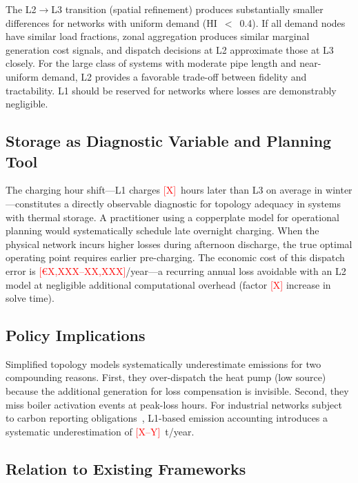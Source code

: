 \documentclass[review,3p]{elsarticle}
\newcommand{\placeholder}[1]{\textcolor{red}{[#1]}}
\begin{document}
The L2$\rightarrow$L3 transition (spatial refinement) produces
substantially smaller differences for networks with uniform demand
(HI~$<$~0.4). If all demand nodes have similar load fractions, zonal
aggregation produces similar marginal generation cost signals, and
dispatch decisions at L2 approximate those at L3 closely. For the large
class of systems with moderate pipe length and near-uniform demand, L2
provides a favorable trade-off between fidelity and tractability. L1
should be reserved for networks where losses are demonstrably negligible.

\subsection{Storage as Diagnostic Variable and Planning Tool}
\label{sec:disc_storage}

The charging hour shift---L1 charges \placeholder{X}~hours later than
L3 on average in winter---constitutes a directly observable diagnostic
for topology adequacy in systems with thermal storage. A practitioner
using a copperplate model for operational planning would systematically
schedule late overnight charging. When the physical network incurs
higher losses during afternoon discharge, the true optimal operating
point requires earlier pre-charging. The economic cost of this dispatch
error is \placeholder{€X,XXX--XX,XXX}/year---a recurring annual loss
avoidable with an L2 model at negligible additional computational overhead
(factor \placeholder{X} increase in solve time).

\subsection{ Policy Implications}
\label{sec:disc_co2}

Simplified topology models systematically underestimate 
emissions for two compounding reasons. First, they over-dispatch the
heat pump (low  source) because the additional generation for
loss compensation is invisible. Second, they miss boiler activation
events at peak-loss hours. For industrial networks subject to carbon
reporting obligations~\cite{EUheating2016}, L1-based emission accounting
introduces a systematic underestimation of
\placeholder{X--Y}~t/year.

\subsection{Relation to Existing Frameworks}
\label{sec:disc_frameworks}
\end{document}
